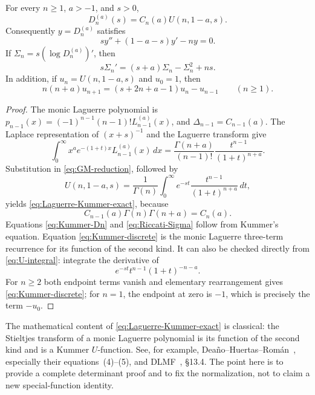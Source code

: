 \begin{theorem}
\label{thm:Laguerre-Kummer-exact}
For every \(n\geq1\), \(a>-1\), and \(s>0\),
\begin{equation}
 \boxed{D_n^{(a)}(s)=C_n(a)U(n,1-a,s).}
 \label{eq:Laguerre-Kummer-exact}
\end{equation}
Consequently \(y=D_n^{(a)}\) satisfies
\begin{equation}
 sy''+(1-a-s)y'-ny=0.
 \label{eq:Kummer-Dn}
\end{equation}
If
\(\Sigma_n=s(\log D_n^{(a)})'\), then
\begin{equation}
 s\Sigma_n'=(s+a)\Sigma_n-\Sigma_n^2+ns.
 \label{eq:Riccati-Sigma}
\end{equation}
In addition, if \(u_n=U(n,1-a,s)\) and \(u_0=1\), then
\begin{equation}
 n(n+a)u_{n+1}=(s+2n+a-1)u_n-u_{n-1}
 \qquad(n\geq1).
 \label{eq:Kummer-discrete}
\end{equation}
\end{theorem}

\begin{proof}
The monic Laguerre polynomial is
\(p_{n-1}(x)=(-1)^{n-1}(n-1)!L_{n-1}^{(a)}(x)\), and
\(\Delta_{n-1}=C_{n-1}(a)\).  The Laplace representation of
\((x+s)^{-1}\) and the Laguerre transform give
\begin{equation}
 \int_0^\infty x^ae^{-(1+t)x}L_{n-1}^{(a)}(x)\,dx
 =\frac{\Gamma(n+a)}{(n-1)!}
   \frac{t^{n-1}}{(1+t)^{n+a}}.
 \label{eq:Laguerre-Laplace}
\end{equation}
Substitution in \eqref{eq:GM-reduction}, followed by
\begin{equation}
 U(n,1-a,s)=\frac1{\Gamma(n)}\int_0^\infty
 e^{-st}\frac{t^{n-1}}{(1+t)^{n+a}}\,dt,
 \label{eq:U-integral}
\end{equation}
yields \eqref{eq:Laguerre-Kummer-exact}, because
\[
 C_{n-1}(a)\Gamma(n)\Gamma(n+a)=C_n(a).
\]
Equations \eqref{eq:Kummer-Dn} and \eqref{eq:Riccati-Sigma} follow from
Kummer's equation.  Equation \eqref{eq:Kummer-discrete} is the monic
Laguerre three-term recurrence for its function of the second kind.  It can
also be checked directly from \eqref{eq:U-integral}: integrate the derivative
of
\[
 e^{-st}t^{n-1}(1+t)^{-n-a}.
\]
For \(n\geq2\) both endpoint terms vanish and elementary rearrangement gives
\eqref{eq:Kummer-discrete}; for \(n=1\), the endpoint at zero is \(-1\), which
is precisely the term \(-u_0\).
\end{proof}

\begin{remark}
The mathematical content of \eqref{eq:Laguerre-Kummer-exact} is classical:
the Stieltjes transform of a monic Laguerre polynomial is its function of the
second kind and is a Kummer \(U\)-function.  See, for example,
Dea\~no--Huertas--Rom\'an~\cite{DeanoHuertasRoman2018}, especially their
equations~(4)--(5), and DLMF~\cite{DLMF}, \S13.4.  The point here is to provide
a complete determinant proof and to fix the normalization, not to claim a new
special-function identity.
\end{remark}

